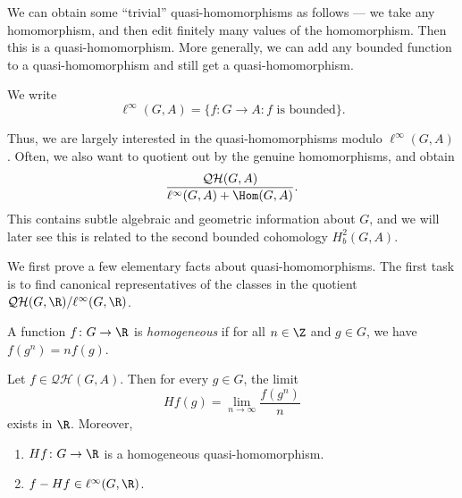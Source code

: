 \documentclass[a4paper]{article}
\newcommand\QH{\mathcal{QH}}
\begin{document}
We can obtain some ``trivial'' quasi-homomorphisms as follows --- we take any homomorphism, and then edit finitely many values of the homomorphism. Then this is a quasi-homomorphism. More generally, we can add any bounded function to a quasi-homomorphism and still get a quasi-homomorphism.

\begin{notation}
  We write
  \[
    \ell^\infty(G, A) = \{f\colon G \to A: \text{$f$ is bounded}\}.
  \]
\end{notation}

Thus, we are largely interested in the quasi-homomorphisms modulo $\ell^\infty(G, A)$. Often, we also want to quotient out by the genuine homomorphisms, and obtain
\[
  \frac{\QH(G, A)}{\ell^\infty(G, A) + \Hom(G, A)}.
\]
This contains subtle algebraic and geometric information about $G$, and we will later see this is related to the second bounded cohomology $H_b^2(G, A)$.

We first prove a few elementary facts about quasi-homomorphisms. The first task is to find canonical representatives of the classes in the quotient $\QH(G, \R)/\ell^\infty (G, \R)$.

\begin{defi}
  A function $f\colon G \to \R$ is \emph{homogeneous} if for all $n \in \Z$ and $g \in G$, we have $f(g^n) = n f(g)$.
\end{defi}

\begin{lemma}
  Let $f \in \QH(G, A)$. Then for every $g \in G$, the limit
  \[
    Hf(g) = \lim_{n \to \infty} \frac{f(g^n)}{n}
  \]
  exists in $\R$. Moreover,
  \begin{enumerate}
    \item $Hf\colon G \to \R$ is a homogeneous quasi-homomorphism.
    \item $f - Hf \in \ell^\infty(G, \R)$.
  \end{enumerate}
\end{lemma}
\end{document}
